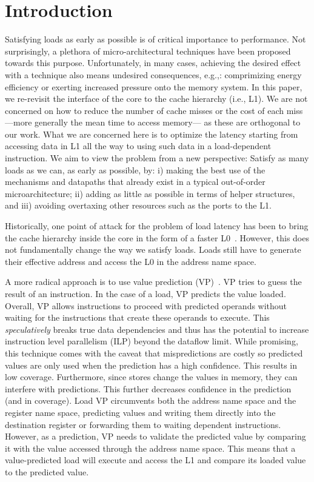 \documentclass{sig-alternate}
\begin{document}
\section{Introduction}
Satisfying loads as early as possible is of critical importance to performance. Not surprisingly, a plethora of micro-architectural techniques have been proposed towards this purpose. Unfortunately, in many cases, achieving the desired effect with a technique also means undesired consequences, e.g.,: comprimizing energy efficiency or exerting increased pressure onto the memory system. 
In this paper, we re-revisit the interface of the core to the cache hierarchy (i.e., L1). We are not concerned on how to reduce the number of cache misses or the cost of each miss ---more generally the mean time to access memory--- as these are orthogonal to our work. What we are concerned here is to optimize the latency starting from accessing data in L1 all the way to using such data in a load-dependent instruction. We aim to view the problem from a new perspective: Satisfy as many loads as we can, as early as possible, by: i) making the best use of the mechanisms and datapaths that already exist in a typical out-of-order microarchitecture; ii) adding as little as possible in terms of helper structures, and iii) avoiding overtaxing other resources such as the ports to the L1.

Historically, one point of attack for the problem of load latency has been to bring the cache hierarchy inside the core in the form of a faster L0~\cite{}. However, this does not fundamentally change the way we satisfy loads.  Loads still have to generate their effective address and access the L0 in the address name space.

A more radical approach is to use value prediction (VP)~\cite{lipasti-shen, others more recent}. VP tries to guess the result of an instruction. In the case of a load, VP predicts the value loaded. Overall, VP allows instructions to proceed with predicted operands without waiting for the instructions that create these operands to execute. This \emph{speculatively} breaks true data dependencies and thus has the potential to increase instruction level parallelism (ILP) beyond the dataflow limit.
While promising, this technique comes with the caveat that mispredictions are costly so predicted values are only used when the prediction has a high confidence. This results in low coverage. Furthermore, since stores change the values in memory, they can interfere with predictions. This further decreases confidence in the prediction (and in coverage).
Load VP circumvents both the address name space and the register name space, predicting values and writing them directly into the destination register or forwarding them to waiting dependent instructions. However, as a prediction, VP needs to validate the predicted value by comparing it with the value accessed through the address name space. This means that a value-predicted load will execute and access the L1 and compare its loaded value to the predicted value. 
 
\end{document}
